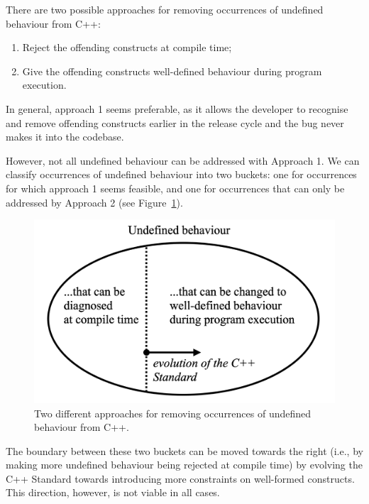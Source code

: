 There are two possible approaches for removing occurrences of undefined behaviour from C++:
\begin{enumerate}
\item Reject the offending constructs at compile time;
\item Give the offending constructs well-defined behaviour during program execution.
\end{enumerate}
In general, approach 1 seems preferable, as it allows the developer to recognise and remove offending constructs earlier in the release cycle and the bug never makes it into the codebase.

However, not all undefined behaviour can be addressed with Approach 1. We can classify occurrences of undefined behaviour into two buckets: one for occurrences for which approach 1 seems feasible, and one for occurrences that can only be addressed by Approach 2 (see Figure~\ref{fig_buckets}).

\begin{figure}[b]
\begin{center}
\includegraphics[scale=0.29]{images/p3100_buckets.png}
\end{center}
\caption{Two different approaches for removing occurrences of undefined behaviour from C++.}
\label{fig_buckets}
\end{figure}

The boundary between these two buckets can be moved towards the right (i.e., by making more undefined behaviour being rejected at compile time) by evolving the C++ Standard towards introducing more constraints on well-formed constructs. This direction, however, is not viable in all cases.

